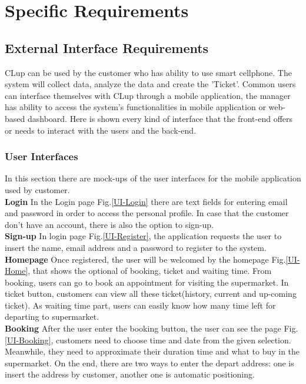 \documentclass[a4paper,12pt]{report}
\begin{document}
\chapter{Specific Requirements} \label{C3:SpecificRequirements}

\section{External Interface Requirements}
CLup can be used by the customer who has ability to use smart cellphone. The system will
collect data, analyze the data and create the 'Ticket'. Common users can interface themselves with CLup through a mobile application, the manager has ability to access the system’s functionalities in mobile application or web-based dashboard. Here is shown every kind of
interface that the front-end offers or needs to interact with the users and the back-end.
\subsection{User Interfaces}
In this section there are mock-ups of the user interfaces for the mobile application used
by customer.\\

\textbf{Login} In the Login page Fig.\ref{UI-Login} there are text fields for entering email and password in order to access the personal profile. In case that the customer don't have an account, there is also the option to sign-up.\\

\textbf{Sign-up} In login page Fig.\ref{UI-Register}, the application requests the user to insert the name, email address and a password to register to the system.\\

\textbf{Homepage} Once registered, the user will be welcomed by the homepage Fig.\ref{UI-Home}, that shows the optional of booking, ticket and waiting time. From booking, users can go to book an appointment for visiting the supermarket. In ticket button, customers can view all these ticket(history, current and up-coming ticket). As waiting time part, users can easily know how many time left for departing to supermarket.\\

\textbf{Booking} After the user enter the booking button, the user can see the page Fig.\ref{UI-Booking}, customers need to choose time and date from the given selection. Meanwhile, they need to approximate their duration time and what to buy in the supermarket. On the end, there are two ways to enter the depart address: one is insert the address by customer, another one is automatic positioning.\\
\end{document}
